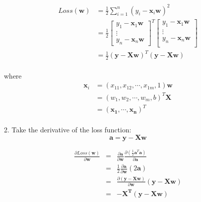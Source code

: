 \documentclass[journal, a4paper]{IEEEtran}
\begin{document}
\begin{equation}
	\begin{aligned}
Loss(\boldsymbol{w})&=\frac{1}{2}\sum_{i=1}^{n}{(y_i-\boldsymbol{x}_i\boldsymbol{w})^2}\\
&=\frac{1}{2}\begin{bmatrix}y_1-\boldsymbol{x}_1\boldsymbol{w} \\ \vdots \\  y_n-\boldsymbol{x}_n\boldsymbol{w}\end{bmatrix}^T\begin{bmatrix}y_1-\boldsymbol{x}_1\boldsymbol{w} \\ \vdots \\  y_n-\boldsymbol{x}_n\boldsymbol{w} \\ 
    \end{bmatrix}\\ \nonumber
&=\frac{1}{2}(\boldsymbol{y-Xw})^T(\boldsymbol{y-Xw})
	\end{aligned}
\end{equation}
\\
where 
\begin{equation}
	\begin{aligned}
\boldsymbol{x}_i &=(x_{11},x_{12},\cdots,x_{1m},1)\boldsymbol{w}\\
&                 =(w_1,w_2,\cdots,w_m,b)^T \boldsymbol{X}\\ \nonumber
&                 =(\boldsymbol{x_1},\cdots,\boldsymbol{x_n})^T\\
	\end{aligned}
\end{equation}	

2. Take the derivative of the loss function:\\
 $$\boldsymbol{ a= y-Xw}$$

\begin{eqnarray}
\nonumber
    \frac{\partial{Loss(\boldsymbol{w})}}{\partial{\boldsymbol{w}}}&=&\frac{\partial \boldsymbol{a}}{\partial\boldsymbol{w}}\frac{\partial{(\frac{1}{2}\boldsymbol{a}^T\boldsymbol{a})}}{{\partial \boldsymbol{a}}}\\ \nonumber
    &=&\frac{1}{2}\frac{\partial{\boldsymbol{a}}}{\partial{\boldsymbol{w}}}(2\boldsymbol{a})\\ \nonumber
    &=&\frac{\partial {(\boldsymbol{y-Xw})}}{\partial\boldsymbol{w}}(\boldsymbol{y-Xw})\\ \nonumber
    &=&\boldsymbol{-X^T(y-Xw)}
\end{eqnarray}
\end{document}
